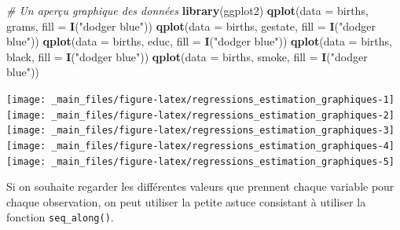 \documentclass[
  11pt,
]{book}
\newenvironment{Shaded}{\begin{snugshade}}{\end{snugshade}}
\newcommand{\CommentTok}[1]{\textcolor[rgb]{0.56,0.35,0.01}{\textit{#1}}}
\newcommand{\DataTypeTok}[1]{\textcolor[rgb]{0.13,0.29,0.53}{#1}}
\newcommand{\KeywordTok}[1]{\textcolor[rgb]{0.13,0.29,0.53}{\textbf{#1}}}
\newcommand{\NormalTok}[1]{#1}
\newcommand{\StringTok}[1]{\textcolor[rgb]{0.31,0.60,0.02}{#1}}
\numberwithin{equation}{section}
\numberwithin{countremarque}{section}
\begin{document}
\begin{Shaded}
\begin{Highlighting}[]
\CommentTok{\# Un aperçu graphique des données}
\KeywordTok{library}\NormalTok{(ggplot2)}
\KeywordTok{qplot}\NormalTok{(}\DataTypeTok{data =}\NormalTok{ births, grams, }\DataTypeTok{fill =} \KeywordTok{I}\NormalTok{(}\StringTok{"dodger blue"}\NormalTok{))}
\KeywordTok{qplot}\NormalTok{(}\DataTypeTok{data =}\NormalTok{ births, gestate, }\DataTypeTok{fill =} \KeywordTok{I}\NormalTok{(}\StringTok{"dodger blue"}\NormalTok{))}
\KeywordTok{qplot}\NormalTok{(}\DataTypeTok{data =}\NormalTok{ births, educ, }\DataTypeTok{fill =} \KeywordTok{I}\NormalTok{(}\StringTok{"dodger blue"}\NormalTok{))}
\KeywordTok{qplot}\NormalTok{(}\DataTypeTok{data =}\NormalTok{ births, black, }\DataTypeTok{fill =} \KeywordTok{I}\NormalTok{(}\StringTok{"dodger blue"}\NormalTok{))}
\KeywordTok{qplot}\NormalTok{(}\DataTypeTok{data =}\NormalTok{ births, smoke, }\DataTypeTok{fill =} \KeywordTok{I}\NormalTok{(}\StringTok{"dodger blue"}\NormalTok{))}
\end{Highlighting}
\end{Shaded}

\begin{center}\texttt{[image: \_main\_files/figure-latex/regressions\_estimation\_graphiques-1]} \texttt{[image: \_main\_files/figure-latex/regressions\_estimation\_graphiques-2]} \texttt{[image: \_main\_files/figure-latex/regressions\_estimation\_graphiques-3]} \texttt{[image: \_main\_files/figure-latex/regressions\_estimation\_graphiques-4]} \texttt{[image: \_main\_files/figure-latex/regressions\_estimation\_graphiques-5]} \end{center}

Si on souhaite regarder les différentes valeurs que prennent chaque variable pour chaque observation, on peut utiliser la petite astuce consistant à utiliser la fonction \texttt{seq\_along()}.
\end{document}
